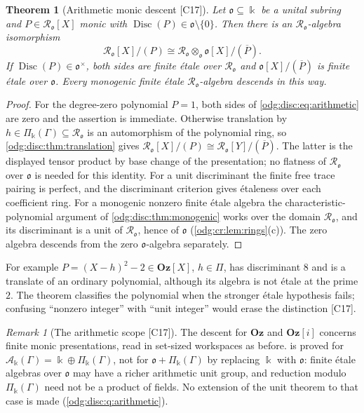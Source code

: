 \documentclass[11pt,oneside]{article}
\numberwithin{equation}{section}
\newtheorem{theorem}{Theorem}[section]
\theoremstyle{definition}
\theoremstyle{remark}
\newtheorem{remark}[remark]{Remark}
\newcommand{\Oz}{\mathbf{Oz}}
\newcommand{\src}[1]{\textup{\textsf{\small[#1]}}}
\newcommand{\Og}{\Oz[i]}
\newcommand{\crA}{\mathcal A_\Bbbk(\Gamma)}
\newcommand{\crP}{\Pi_\Bbbk(\Gamma)}
\newcommand{\Disc}{\operatorname{Disc}}
\begin{document}
\begin{theorem}[Arithmetic monic descent \src{C17}]\label{odg:disc:thm:arithmetic}
Let $\mathfrak o\subseteq\Bbbk$ be a unital subring and $P\in\mathcal R_{\mathfrak o}[X]$
monic with $\Disc(P)\in\mathfrak o\setminus\{0\}$. Then there is an
$\mathcal R_{\mathfrak o}$-algebra isomorphism
\begin{equation}\label{odg:disc:eq:arithmetic}
 \mathcal R_{\mathfrak o}[X]/(P)\cong\mathcal R_{\mathfrak o}\otimes_{\mathfrak o}
 \mathfrak o[X]/(\overline P).
\end{equation}
If $\Disc(P)\in\mathfrak o^\times$, both sides are finite \'etale over
$\mathcal R_{\mathfrak o}$ and $\mathfrak o[X]/(\overline P)$ is finite \'etale over
$\mathfrak o$. Every monogenic finite \'etale $\mathcal R_{\mathfrak o}$-algebra descends in
this way.
\end{theorem}
\begin{proof}
For the degree-zero polynomial $P=1$, both sides of \eqref{odg:disc:eq:arithmetic}
are zero and the assertion is immediate. Otherwise translation by
$h\in\crP\subseteq\mathcal R_{\mathfrak o}$ is an automorphism of the polynomial ring,
so \cref{odg:disc:thm:translation} gives
$\mathcal R_{\mathfrak o}[X]/(P)\cong\mathcal R_{\mathfrak o}[Y]/(\overline P)$.
The latter is the displayed tensor product by base change of the presentation;
no flatness of $\mathcal R_{\mathfrak o}$ over $\mathfrak o$ is needed for this identity.
For a unit discriminant the finite free trace pairing is perfect, and the
discriminant criterion gives \'etaleness over each coefficient ring. For a monogenic
nonzero finite \'etale algebra the characteristic-polynomial argument of
\cref{odg:disc:thm:monogenic} works over the domain $\mathcal R_{\mathfrak o}$, and its
discriminant is a unit of $\mathcal R_{\mathfrak o}$, hence of $\mathfrak o$
(\cref{odg:cr:lem:rings}(c)). The zero algebra descends from the zero
$\mathfrak o$-algebra separately.
\end{proof}

For example $P=(X-h)^2-2\in\Oz[X]$, $h\in\Pi$, has discriminant $8$ and is a translate of
an ordinary polynomial, although its algebra is not \'etale at the prime $2$. The theorem
classifies the polynomial when the stronger \'etale hypothesis fails; confusing ``nonzero
integer'' with ``unit integer'' would erase the distinction \src{C17}.

\begin{remark}[The arithmetic scope \src{C17}]\label{odg:disc:rem:scope}
The descent for $\Oz$ and $\Og$ concerns finite monic presentations, read in set-sized
workspaces as before.  is proved for $\crA=\Bbbk\oplus\crP$, not
for $\mathfrak o+\crP$ by replacing $\Bbbk$ with $\mathfrak o$: finite \'etale algebras
over $\mathfrak o$ may have a richer arithmetic unit group, and reduction modulo $\crP$
need not be a product of fields. No extension of the unit theorem to that case is made
(\cref{odg:disc:q:arithmetic}).
\end{remark}
\end{document}

